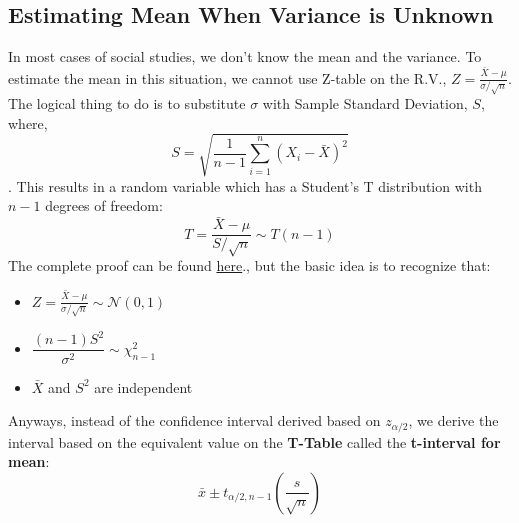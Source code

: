  
\subsection {Estimating Mean When Variance is Unknown}
 In most cases of social studies, we don't know the mean and the variance. To estimate the mean in this situation, we cannot use Z-table on the R.V., \(  Z = \frac{\bar{X}-\mu}{\sigma/\sqrt{n}} \). The logical thing to do is to substitute $\sigma$ with Sample Standard Deviation, $S$, where,
 	\[ S=\sqrt{\dfrac{1}{n-1}\sum\limits_{i=1}^n (X_i-\bar{X})^2} \].
This results in a random variable which has a Student's T distribution with $n-1$ degrees of freedom:
	\[ T=\dfrac{\bar{X}-\mu}{S/\sqrt{n}} \sim T(n-1) \]
The complete proof can be found \href{https://online.stat.psu.edu/stat414/node/199/}{here}., but the basic idea is to recognize that:
	\begin{itemize}
	\item \(  Z = \frac{\bar{X}-\mu}{\sigma/\sqrt{n}} \sim \mathcal{N}(0,1) \)
	\item \( \dfrac{(n-1)S^2}{\sigma^2}\sim \chi^2_{n-1} \)
	\item \(\bar{X}\) and \(S^2\) are independent
	\end{itemize}

Anyways, instead of the confidence interval derived based on $z_{\alpha/2}$, we derive the interval based on the equivalent value on the \textbf{T-Table} called the \textbf{t-interval for mean}:
	\[ \bar{x}\pm t_{\alpha/2,n-1}\left(\dfrac{s}{\sqrt{n}}\right) \]
	
